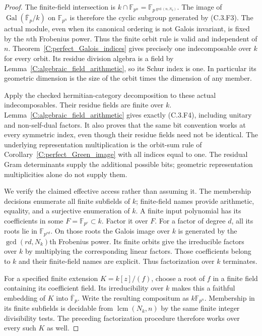 \begin{proof}
The finite-field intersection is
$k\cap\mathbb F_{p^n}=\mathbb F_{p^{\gcd(n,N_k)}}$.
The image of $\operatorname{Gal}(\overline{\mathbb F}_p/k)$
on $\mathbb F_{p^n}$ is therefore the cyclic subgroup generated
by (C.3.F3). The actual module, even when its canonical ordering
is not Galois invariant, is fixed by the $n$th Frobenius power.
Thus the finite orbit rule is valid and independent of $n$.
Theorem~\ref{C:perfect_Galois_indices} gives precisely one
indecomposable over $k$ for every orbit. Its residue division
algebra is a field by Lemma~\ref{C:algebraic_field_arithmetic},
so its Schur index is one. In particular its geometric dimension
is the size of the orbit times the dimension of any member.

Apply the checked hermitian-category decomposition to these
actual indecomposables. Their residue fields are finite over $k$.
Lemma~\ref{C:algebraic_field_arithmetic} gives exactly (C.3.F4),
including unitary and non-self-dual factors. It also proves that
the same bit convention works at every symmetric index, even
though their residue fields need not be identical. The underlying
representation multiplication is the orbit-sum rule of
Corollary~\ref{C:perfect_Green_image} with all indices equal to one.
The residual Gram determinants supply the additional possible bits;
geometric representation multiplicities alone do not supply them.

We verify the claimed effective access rather than assuming it.
The membership decisions enumerate all finite subfields of $k$;
finite-field names provide arithmetic, equality, and a surjective
enumeration of $k$. A finite input polynomial has its coefficients
in some $F=\mathbb F_{p^r}\subset k$. Factor it over $F$.
For a factor of degree $d$, all its roots lie in
$\mathbb F_{p^{rd}}$. On those roots the Galois image over $k$
is generated by the $\gcd(rd,N_k)$th Frobenius power.
Its finite orbits give the irreducible factors over $k$ by
multiplying the corresponding linear factors. Those coefficients
belong to $k$ and their finite-field names are explicit.
Thus factorization over $k$ terminates.

For a specified finite extension $K=k[z]/(f)$, choose a root of
$f$ in a finite field containing its coefficient field. Its
irreducibility over $k$ makes this a faithful embedding of $K$
into $\overline{\mathbb F}_p$. Write the resulting compositum
as $k\mathbb F_{p^n}$. Membership in its finite subfields is
decidable from $\operatorname{lcm}(N_k,n)$ by the same finite
integer divisibility tests. The preceding factorization procedure
therefore works over every such $K$ as well.


\end{proof}
